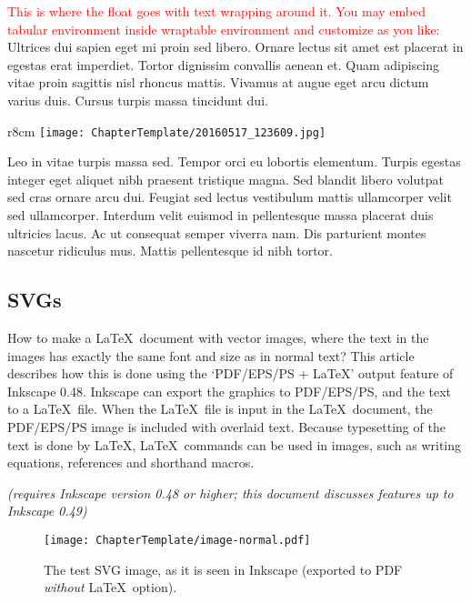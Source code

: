 \textcolor{red}{This is where the float goes with text wrapping around it. You
may embed tabular environment inside wraptable environment and customize as you
like:} Ultrices dui sapien eget mi proin sed libero. Ornare lectus sit amet est
placerat in egestas erat imperdiet. Tortor dignissim convallis aenean et. Quam
adipiscing vitae proin sagittis nisl rhoncus mattis. Vivamus at augue eget arcu
dictum varius duis. Cursus turpis massa tincidunt dui.
\begin{wrapfigure}{r}{8cm}
    \centering
    \texttt{[image: ChapterTemplate/20160517\_123609.jpg]}
  \end{wrapfigure}
Leo in vitae turpis massa sed. Tempor orci eu lobortis elementum. Turpis egestas
integer eget aliquet nibh praesent tristique magna. Sed blandit libero volutpat
sed cras ornare arcu dui. Feugiat sed lectus vestibulum mattis ullamcorper velit
sed ullamcorper. Interdum velit euismod in pellentesque massa placerat duis
ultricies lacus. Ac ut consequat semper viverra nam. Dis parturient montes
nascetur ridiculus mus. Mattis pellentesque id nibh tortor.

\subsection{SVGs}
How to make a \LaTeX\ document with vector images, where the text in the images
has exactly the same font and size as in normal text? This article describes how
this is done using the `PDF/EPS/PS + LaTeX' output feature of Inkscape 0.48.
Inkscape can export the graphics to PDF/EPS/PS, and the text to a \LaTeX\ file.
When the \LaTeX\ file is input in the \LaTeX\ document, the PDF/EPS/PS image is
included with overlaid text. Because typesetting of the text is done by \LaTeX,
\LaTeX\ commands can be used in images, such as writing equations, references
and shorthand macros.

\emph{(requires Inkscape version 0.48 or higher; this document discusses features up to Inkscape 0.49)}

\begin{figure}
    \centering
      \texttt{[image: ChapterTemplate/image-normal.pdf]}
      \caption[The test SVG image, as it is seen in Inkscape]
      {The test SVG image, as it is seen in Inkscape (exported to PDF
      \emph{without} \LaTeX\ option).}
      \label{fig:normal}
\end{figure}

